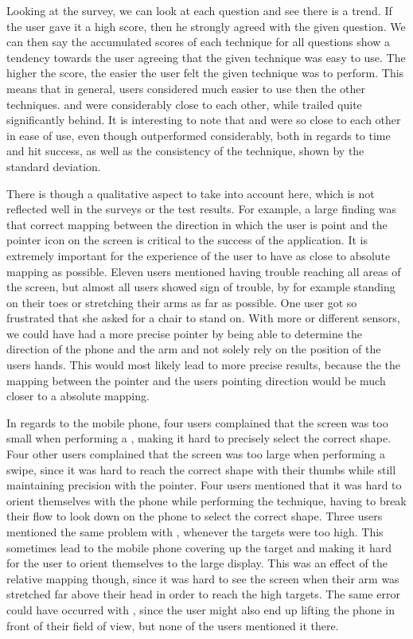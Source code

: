 Looking at the survey, we can look at each question and see there is a trend.
If the user gave it a high score, then he strongly agreed with the given question.
We can then say the accumulated scores of each technique for all questions show a tendency towards the user agreeing that the given technique was easy to use.
The higher the score, the easier the user felt the given technique was to perform.
This means that in general, users considered \swipe much easier to use then the other techniques. 
\throw and \tilt were considerably close to each other, while \pinch trailed quite significantly behind.
It is interesting to note that \throw and \tilt were so close to each other in ease of use, even though \throw outperformed \tilt considerably, both in regards to time and hit success, as well as the consistency of the technique, shown by the standard deviation. 

There is though a qualitative aspect to take into account here, which is not reflected well in the surveys or the test results.
For example, a large finding was that correct mapping between the direction in which the user is point and the pointer icon on the screen is critical to the success of the application.
It is extremely important for the experience of the user to have as close to absolute mapping as possible. 
Eleven users mentioned having trouble reaching all areas of the screen, but almost all users showed sign of trouble, by for example standing on their toes or stretching their arms as far as possible.
One user got so frustrated that she asked for a chair to stand on. 
With more or different sensors, we could have had a more precise pointer by being able to determine the direction of the phone and the arm and not solely rely on the position of the users hands.
This would most likely lead to more precise results, because the the mapping between the pointer and the users pointing direction would be much closer to a absolute mapping.

In regards to the mobile phone, four users complained that the screen was too small when performing a \pinch, making it hard to precisely select the correct shape.
Four other users complained that the screen was too large when performing a swipe, since it was hard to reach the correct shape with their thumbs while still maintaining precision with the pointer. 
Four users mentioned that it was hard to orient themselves with the phone while performing the \throw technique, having to break their flow to look down on the phone to select the correct shape. 
Three users mentioned the same problem with \swipe, whenever the targets were too high.
This sometimes lead to the mobile phone covering up the target and making it hard for the user to orient themselves to the large display. 
This was an effect of the relative mapping though, since it was hard to see the screen when their arm was stretched far above their head in order to reach the high targets.
The same error could have occurred with \tilt, since the user might also end up lifting the phone in front of their field of view, but none of the users mentioned it there.  

